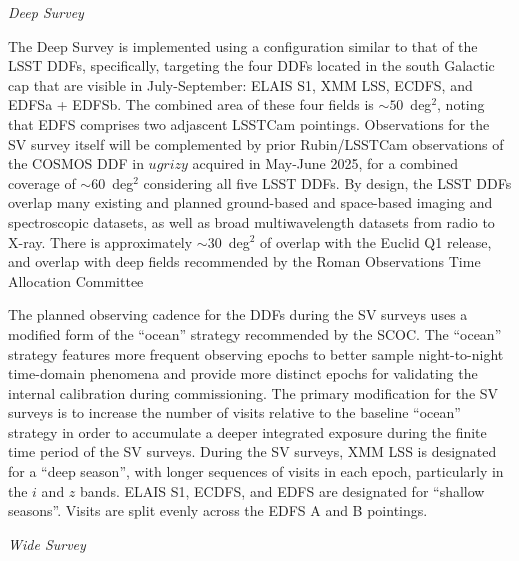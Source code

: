\textit{Deep Survey}

The Deep Survey is implemented using a configuration similar to that of the LSST DDFs, specifically, targeting the four DDFs located in the south Galactic cap that are visible in July-September: ELAIS S1, XMM LSS, ECDFS, and EDFSa + EDFSb.
The combined area of these four fields is $\sim50$~deg$^2$, noting that EDFS comprises two adjascent LSSTCam pointings.
Observations for the SV survey itself will be complemented by prior Rubin/LSSTCam observations of the COSMOS DDF in $ugrizy$ acquired in May-June 2025, for a combined coverage of $\sim60$~deg$^2$ considering all five LSST DDFs.
By design, the LSST DDFs overlap many existing and planned ground-based and space-based imaging and spectroscopic datasets, as well as broad multiwavelength datasets from radio to X-ray.
There is approximately $\sim30$~deg$^2$ of overlap with the Euclid Q1 release, and overlap with deep fields recommended by the Roman Observations Time Allocation Committee

The planned observing cadence for the DDFs during the SV surveys uses a modified form of the ``ocean'' strategy recommended by the SCOC.
The ``ocean'' strategy features more frequent observing epochs to better sample night-to-night time-domain phenomena and provide more distinct epochs for validating the internal calibration during commissioning.
The primary modification for the SV surveys is to increase the number of visits relative to the baseline ``ocean'' strategy in order to accumulate a deeper integrated exposure during the finite time period of the SV surveys.
During the SV surveys, XMM LSS is designated for a ``deep season'', with longer sequences of visits in each epoch, particularly in the $i$ and $z$ bands.
ELAIS S1, ECDFS, and EDFS are designated for ``shallow seasons''.
Visits are split evenly across the EDFS A and B pointings.

\textit{Wide Survey}

